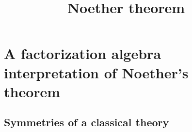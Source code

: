 \documentclass[10pt]{amsart}
\title{Noether theorem}
\begin{document}
\maketitle

\section{A factorization algebra interpretation of Noether's theorem}

\subsection{Symmetries of a classical theory}
\end{document}

